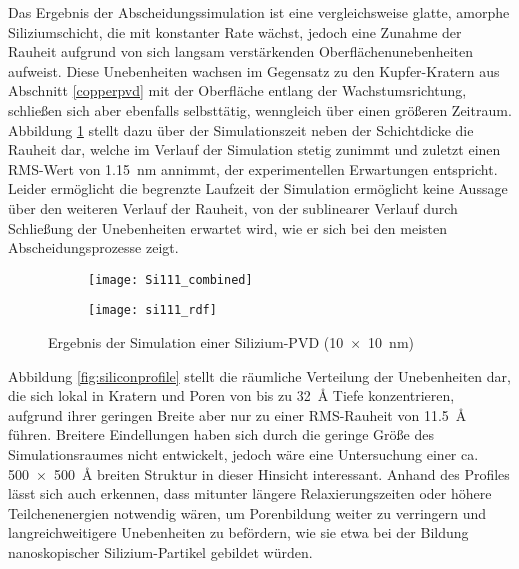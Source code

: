 Das Ergebnis der Abscheidungssimulation ist eine vergleichsweise glatte, amorphe Siliziumschicht, die mit konstanter Rate wächst, jedoch eine Zunahme der Rauheit aufgrund von sich langsam verstärkenden Oberflächenunebenheiten aufweist.
Diese Unebenheiten wachsen im Gegensatz zu den Kupfer-Kratern aus Abschnitt \ref{copperpvd} mit der Oberfläche entlang der Wachstumsrichtung, schließen sich aber ebenfalls selbsttätig, wenngleich über einen größeren Zeitraum.
Abbildung \ref{fig:siliconresults-a} stellt dazu über der Simulationszeit neben der Schichtdicke die Rauheit dar, welche im Verlauf der Simulation stetig zunimmt und zuletzt einen RMS-Wert von \SI{1.15}{\nano\meter} annimmt, der experimentellen Erwartungen entspricht.
Leider ermöglicht die begrenzte Laufzeit der Simulation ermöglicht keine Aussage über den weiteren Verlauf der Rauheit, von der sublinearer Verlauf durch Schließung der Unebenheiten erwartet wird, wie er sich bei den meisten Abscheidungsprozesse zeigt.

\begin{figure}
  \captionsetup[subfigure]{singlelinecheck=false}
  \def\subfigwidth{0.48\textwidth}
  \begin{subfigure}[t]{\subfigwidth}
    \texttt{[image: Si111\_combined]}
    \label{fig:siliconresults-a}
  \end{subfigure}
  \begin{subfigure}[t]{\subfigwidth}
    \texttt{[image: si111\_rdf]}
    \label{fig:siliconresults-b}
  \end{subfigure}
  \hfill
  \caption[Ergebnisse der Simulation einer Silizium-PVD]{Ergebnis der Simulation einer Silizium-PVD (\SI{10x10}{\nano\meter})}
  \label{fig:siliconresults}
\end{figure}

Abbildung \ref{fig:siliconprofile} stellt die räumliche Verteilung der Unebenheiten dar, die sich lokal in Kratern und Poren von bis zu \SI{32}{\angstrom} Tiefe konzentrieren, aufgrund ihrer geringen Breite aber nur zu einer RMS-Rauheit von \SI{11.5}{\angstrom} führen.
Breitere Eindellungen haben sich durch die geringe Größe des Simulationsraumes nicht entwickelt, jedoch wäre eine Untersuchung einer ca. \SI{500x500}{\angstrom} breiten Struktur in dieser Hinsicht interessant.
Anhand des Profiles lässt sich auch erkennen, dass mitunter längere Relaxierungszeiten oder höhere Teilchenenergien notwendig wären, um Porenbildung weiter zu verringern und langreichweitigere Unebenheiten zu befördern, wie sie etwa bei der Bildung nanoskopischer Silizium-Partikel gebildet würden.

